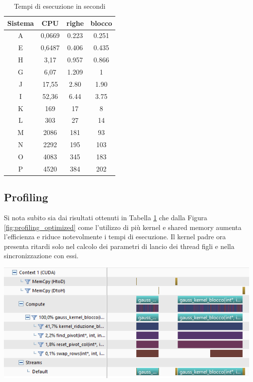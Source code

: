 \documentclass{article}
\begin{document}
\begin{table}[h!]
\centering
 \begin{tabular}{|c | c | c | c |} 
 \hline
 Sistema & CPU & righe & blocco\\
 \hline
A & 0,0669    & 0.223 & 0.251\\
E & 0,6487    & 0.406 & 0.435\\	
H & 3,17      & 0.957 & 0.866\\
G & 6,07      & 1.209 & 1\\
J & 17,55     & 2.80  & 1.90\\
I & 52,36     & 6.44  & 3.75\\
K & 169       & 17    & 8\\
L & 303       & 27    & 14\\
M & 2086      & 181   & 93\\
N & 2292      & 195   & 103\\
O & 4083      & 345   & 183\\
P & 4520      & 384   & 202\\
 \hline

\end{tabular}
\caption{Tempi di esecuzione in secondi}
\label{table:3}
\end{table}

\subsection{Profiling}
Si nota subito sia dai risultati ottenuti in Tabella \ref{table:3} che dalla Figura \ref{fig:profiling_optimized} come l'utilizzo di più kernel e shared memory aumenta l'efficienza e riduce notevolmente i tempi di esecuzione. Il kernel padre ora presenta ritardi solo nel calcolo dei parametri di lancio dei thread figli e nella sincronizzazione con essi.
	\begin{center}
		\includegraphics[width = \textwidth]{profiling_optimized.png}
		\label{fig:profiling_optimized}
	\end{center}
\end{document}
